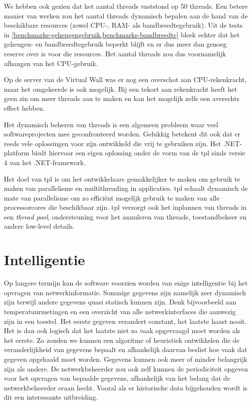 We hebben ook gezien dat het aantal threads vaststond op 50 threads.
Een betere manier van werken zou het aantal threads dynamisch bepalen aan de hand van de beschikbare resources (zowel CPU-, RAM- als bandbreedtegebruik).
Uit de tests in \cref{benchmarks-geheugengebruik,benchmarks-bandbreedte} bleek echter dat het geheugen- en bandbreedtegebruik beperkt blijft
en er dus meer dan genoeg reserve over is voor die resources.
Het aantal threads zou dus voornamelijk afhangen van het CPU-gebruik.

Op de server van de Virtual Wall was er nog een overschot aan CPU-rekenkracht,
maar het omgekeerde is ook mogelijk.
Bij een tekort aan rekenkracht heeft het geen zin om meer threads aan te maken en kan het mogelijk zelfs een averechts effect hebben.

Het dynamisch beheren van threads is een algemeen probleem waar veel softwareprojecten mee geconfronteerd worden.
Gelukkig betekent dit ook dat er reeds vele oplossingen voor zijn ontwikkeld die vrij te gebruiken zijn.
Het .NET-platform biedt hiervoor een eigen oplossing onder de vorm van de \gls{tpl} sinds versie 4 van het .NET-framework.

Het doel van \gls{tpl} is om het ontwikkelaars gemakkelijker te maken om gebruik te maken van parallelisme en multithreading in applicaties.
\Gls{tpl} schaalt dynamisch de mate van parallelisme om zo efficiënt mogelijk gebruik te maken van alle processorcores die beschikbaar zijn.
\Gls{tpl} verzorgt ook het inplannen van threads in een \textit{thread pool}, ondersteuning voor het annuleren van threads, toestandbeheer en
andere low-level details\cite{msdn-tpl}.


\section{Intelligentie}

Op langere termijn kan de software voorzien worden van enige intelligentie bij het opvragen van netwerkinformatie.
Sommige gegevens zijn namelijk zeer dynamisch zijn terwijl andere gegevens quasi statisch kunnen zijn.
Denk bijvoorbeeld aan temperatuurmetingen en een overzicht van alle netwerkinterfaces die aanwezig zijn in een toestel.
Het eerste gegeven verandert constant, het laatste haast nooit.
Het is dan ook logisch dat het laatste niet zo vaak opgevraagd moet worden als het eerste.
Zo zouden we kunnen een algoritme of heuristiek ontwikkelen die de veranderlijkheid van gegevens bepaalt en afhankelijk daarvan
beslist hoe vaak dat gegeven opgehaald moet worden.
Gegevens kunnen ook meer of minder belangrijk zijn als andere.
De netwerkbeheerder zou ook zelf kunnen de periodiciteit opgeven voor het opvragen van bepaalde gegevens,
afhankelijk van het belang dat de netwerkbeheerder eraan hecht.
Vooral als er historische data bijgehouden wordt is dit een interessante uitbreiding.


